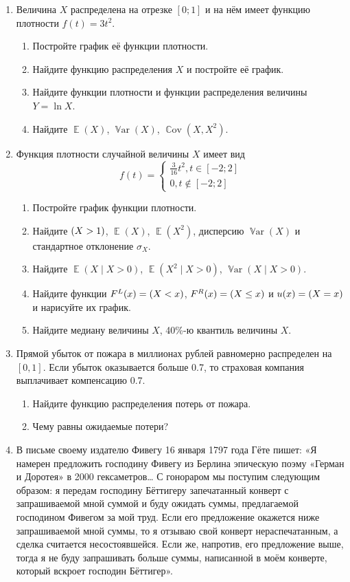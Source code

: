 \documentclass[12pt]{article}
\DeclareMathOperator{\Cov}{\mathbb{C}ov}
\DeclareMathOperator{\Var}{\mathbb{V}ar}
\let\P\relax
\DeclareMathOperator{\P}{\mathbb{P}}
\DeclareMathOperator{\E}{\mathbb{E}}
\begin{document}
\begin{enumerate}[resume]

\item Величина $X$ распределена на отрезке $[0;1]$ и на нём имеет функцию плотности $f(t)=3t^2$. 

\begin{enumerate}
 \item Постройте график её функции плотности.
 \item Найдите функцию распределения $X$ и постройте её график.
 \item Найдите функции плотности и функции распределения величины $Y=\ln X$.
\item Найдите $\E(X)$, $\Var(X)$, $\Cov(X, X^2)$. 
\end{enumerate}

 \item Функция плотности случайной величины  $X$ имеет
 вид
 \[
 f(t)=
 \begin{cases}
   \frac{3}{16}t^2,t\in [-2;2] \\
   0, t\notin [-2;2]
 \end{cases}
 \]
 \begin{enumerate}
 \item Постройте график функции плотности.
 \item Найдите $\P(X>1)$, $\E(X)$, $\E(X^2)$, дисперсию $\Var(X)$ и стандартное отклонение $\sigma_X$.
 \item Найдите $\E(X \mid X>0)$, $\E(X^2 \mid X>0)$, $\Var(X \mid X>0)$.
 \item Найдите функции $F^L(x) = \P(X <x)$, $F^R(x) = \P(X \leq x)$ и $u(x) = \P(X=x)$ и нарисуйте их график.
 \item Найдите медиану величины $X$, 40\%-ю квантиль величины $X$.
 \end{enumerate}
 

 \item Прямой убыток от пожара в миллионах рублей равномерно распределен на $[0, 1]$. 
 Если убыток оказывается больше 0.7, то страховая компания выплачивает компенсацию 0.7.
 \begin{enumerate}
 \item Найдите функцию распределения потерь от пожара.
 \item Чему равны ожидаемые потери?
 \end{enumerate}
 
\item В письме своему издателю Фивегу 16 января 1797 года Гёте пишет: «Я намерен предложить господину Фивегу из Берлина 
эпическую поэму «Герман и Доротея» в 2000 гексаметров\ldots{ } С гонораром мы поступим следующим образом:
я передам господину Бёттигеру запечатанный конверт с запрашиваемой мной суммой и буду ожидать 
суммы, предлагаемой господином Фивегом за мой труд. 
Если его предложение окажется ниже запрашиваемой мной суммы, то я отзываю свой конверт нераспечатанным, 
а сделка считается несостоявшейся. 
Если же, напротив, его предложение выше, тогда я не буду запрашивать больше суммы, написанной в моём конверте,
который вскроет господин Бёттигер».



\end{enumerate}
\end{document}
